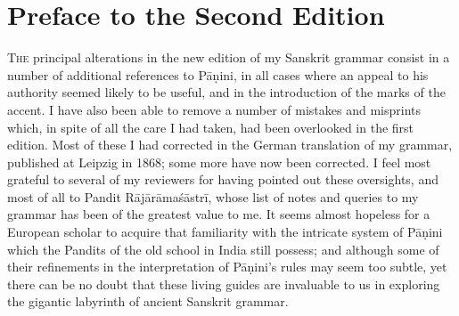 \def\DevnagVersion{2.17}%
\chapter{Preface to the Second Edition}

\textsc{The} principal alterations in the new edition of my Sanskrit
grammar consist in a number of additional references to Pāṇini, in all
cases where an appeal to his authority seemed likely to be useful, and
in the introduction of the marks of the accent. I have also been able to
remove a number of mistakes and misprints which, in spite of all the
care I had taken, had been overlooked in the first edition. Most of
these I had corrected in the German translation of my grammar, published
at Leipzig in 1868; some more have now been corrected. I feel most
grateful to several of my reviewers for having pointed out these
oversights, and most of all to Pandit Rājārāmaśāstrī, whose list of
notes and queries to my grammar has been of the greatest value to me. It
seems almost hopeless for a European scholar to acquire that familiarity
with the intricate system of Pāṇini which the Pandits of the old school
in India still possess; and although some of their refinements in the
interpretation of Pāṇini's rules may seem too subtle, yet there can be
no doubt that these living guides are invaluable to us in exploring the
gigantic labyrinth of ancient Sanskrit grammar.

